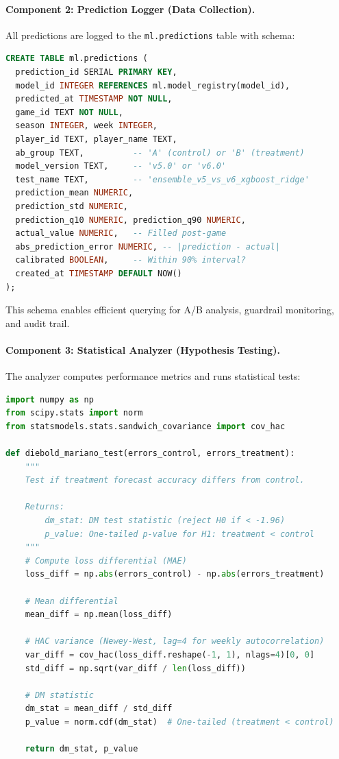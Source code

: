 \paragraph{Component 2: Prediction Logger (Data Collection).}
All predictions are logged to the \texttt{ml.predictions} table with schema:

\begin{lstlisting}[language=SQL, style=codestyle, caption={A/B test prediction logging schema}]
CREATE TABLE ml.predictions (
  prediction_id SERIAL PRIMARY KEY,
  model_id INTEGER REFERENCES ml.model_registry(model_id),
  predicted_at TIMESTAMP NOT NULL,
  game_id TEXT NOT NULL,
  season INTEGER, week INTEGER,
  player_id TEXT, player_name TEXT,
  ab_group TEXT,          -- 'A' (control) or 'B' (treatment)
  model_version TEXT,     -- 'v5.0' or 'v6.0'
  test_name TEXT,         -- 'ensemble_v5_vs_v6_xgboost_ridge'
  prediction_mean NUMERIC,
  prediction_std NUMERIC,
  prediction_q10 NUMERIC, prediction_q90 NUMERIC,
  actual_value NUMERIC,   -- Filled post-game
  abs_prediction_error NUMERIC, -- |prediction - actual|
  calibrated BOOLEAN,     -- Within 90% interval?
  created_at TIMESTAMP DEFAULT NOW()
);
\end{lstlisting}

This schema enables efficient querying for A/B analysis, guardrail monitoring, and audit trail.

\paragraph{Component 3: Statistical Analyzer (Hypothesis Testing).}
The analyzer computes performance metrics and runs statistical tests:

\begin{lstlisting}[language=Python, style=codestyle, caption={Diebold-Mariano test implementation}]
import numpy as np
from scipy.stats import norm
from statsmodels.stats.sandwich_covariance import cov_hac

def diebold_mariano_test(errors_control, errors_treatment):
    """
    Test if treatment forecast accuracy differs from control.

    Returns:
        dm_stat: DM test statistic (reject H0 if < -1.96)
        p_value: One-tailed p-value for H1: treatment < control
    """
    # Compute loss differential (MAE)
    loss_diff = np.abs(errors_control) - np.abs(errors_treatment)

    # Mean differential
    mean_diff = np.mean(loss_diff)

    # HAC variance (Newey-West, lag=4 for weekly autocorrelation)
    var_diff = cov_hac(loss_diff.reshape(-1, 1), nlags=4)[0, 0]
    std_diff = np.sqrt(var_diff / len(loss_diff))

    # DM statistic
    dm_stat = mean_diff / std_diff
    p_value = norm.cdf(dm_stat)  # One-tailed (treatment < control)

    return dm_stat, p_value
\end{lstlisting}

